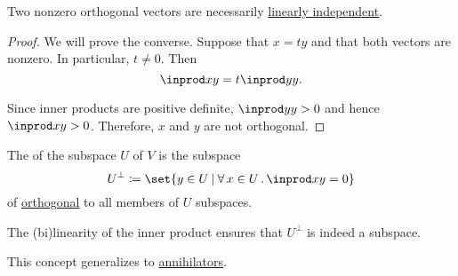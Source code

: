 \begin{proposition}\label{thm:orthogonal_implies_linearly_independent}
  Two nonzero orthogonal vectors are necessarily \hyperref[def:linear_dependence]{linearly independent}.
\end{proposition}
\begin{proof}
  We will prove the converse. Suppose that \( x = ty \) and that both vectors are nonzero. In particular, \( t \neq 0 \). Then
  \begin{equation*}
    \inprod x y = t \inprod y y.
  \end{equation*}

  Since inner products are positive definite, \( \inprod y y > 0 \) and hence \( \inprod x y > 0 \). Therefore, \( x \) and \( y \) are not orthogonal.
\end{proof}

\begin{definition}\label{def:orthogonal_complement}\mimprovised
  The  of the subspace \( U \) of \( V \) is the subspace
  \begin{equation*}
    U^\perp \coloneqq \set{ y \in U \given \qforall {x \in U} \inprod x y = 0 }
  \end{equation*}
  of \hyperref[def:orthogonality]{orthogonal} to all members of \( U \) subspaces.

  The (bi)linearity of the inner product ensures that \( U^\perp \) is indeed a subspace.

  This concept generalizes to \hyperref[def:orthogonal_complement]{annihilators}.
\end{definition}

